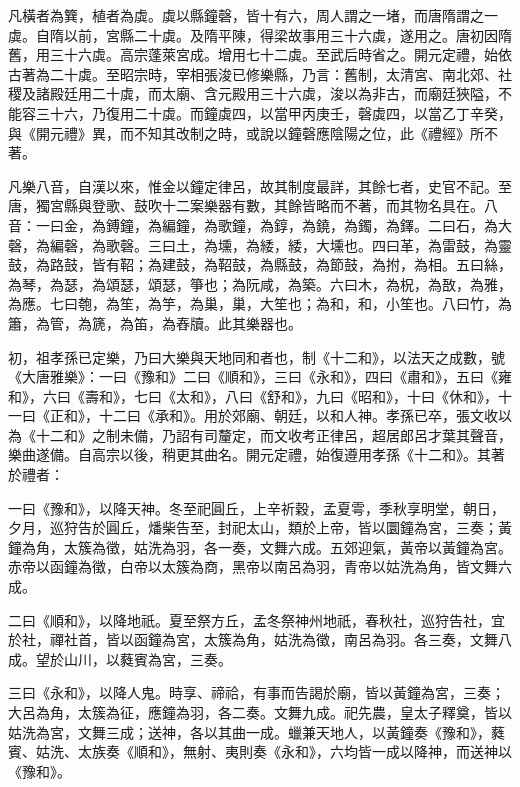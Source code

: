 \begin{pinyinscope}
 凡橫者為簨，植者為虡。虡以縣鐘磬，皆十有六，周人謂之一堵，而唐隋謂之一虡。自隋以前，宮縣二十虡。及隋平陳，得梁故事用三十六虡，遂用之。唐初因隋舊，用三十六虡。高宗蓬萊宮成。增用七十二虡。至武后時省之。開元定禮，始依古著為二十虡。至昭宗時，宰相張浚已修樂縣，乃言：舊制，太清宮、南北郊、社稷及諸殿廷用二十虡，而太廟、含元殿用三十六虡，浚以為非古，而廟廷狹隘，不能容三十六，乃復用二十虡。而鐘虡四，以當甲丙庚壬，磬虡四，以當乙丁辛癸，與《開元禮》異，而不知其改制之時，或說以鐘磬應陰陽之位，此《禮經》所不著。



 凡樂八音，自漢以來，惟金以鐘定律呂，故其制度最詳，其餘七者，史官不記。至唐，獨宮縣與登歌、鼓吹十二案樂器有數，其餘皆略而不著，而其物名具在。八音：一曰金，為鎛鐘，為編鐘，為歌鐘，為錞，為鐃，為鐲，為鐸。二曰石，為大磬，為編磬，為歌磬。三曰土，為壎，為緌，緌，大壎也。四曰革，為雷鼓，為靈鼓，為路鼓，皆有鞀；為建鼓，為鞀鼓，為縣鼓，為節鼓，為拊，為相。五曰絲，為琴，為瑟，為頌瑟，頌瑟，箏也；為阮咸，為築。六曰木，為柷，為敔，為雅，為應。七曰匏，為笙，為竽，為巢，巢，大笙也；為和，和，小笙也。八曰竹，為簫，為管，為篪，為笛，為舂牘。此其樂器也。



 初，祖孝孫已定樂，乃曰大樂與天地同和者也，制《十二和》，以法天之成數，號《大唐雅樂》：一曰《豫和》二曰《順和》，三曰《永和》，四曰《肅和》，五曰《雍和》，六曰《壽和》，七曰《太和》，八曰《舒和》，九曰《昭和》，十曰《休和》，十一曰《正和》，十二曰《承和》。用於郊廟、朝廷，以和人神。孝孫已卒，張文收以為《十二和》之制未備，乃詔有司釐定，而文收考正律呂，超居郎呂才葉其聲音，樂曲遂備。自高宗以後，稍更其曲名。開元定禮，始復遵用孝孫《十二和》。其著於禮者：



 一曰《豫和》，以降天神。冬至祀圓丘，上辛祈穀，孟夏雩，季秋享明堂，朝日，夕月，巡狩告於圓丘，燔柴告至，封祀太山，類於上帝，皆以圜鐘為宮，三奏；黃鐘為角，太簇為徵，姑洗為羽，各一奏，文舞六成。五郊迎氣，黃帝以黃鐘為宮。赤帝以函鐘為徵，白帝以太簇為商，黑帝以南呂為羽，青帝以姑洗為角，皆文舞六成。



 二曰《順和》，以降地祇。夏至祭方丘，孟冬祭神州地祇，春秋社，巡狩告社，宜於社，禪社首，皆以函鐘為宮，太簇為角，姑洗為徵，南呂為羽。各三奏，文舞八成。望於山川，以蕤賓為宮，三奏。



 三曰《永和》，以降人鬼。時享、禘祫，有事而告謁於廟，皆以黃鐘為宮，三奏；大呂為角，太簇為征，應鐘為羽，各二奏。文舞九成。祀先農，皇太子釋奠，皆以姑洗為宮，文舞三成；送神，各以其曲一成。蠟兼天地人，以黃鐘奏《豫和》，蕤賓、姑洗、太族奏《順和》，無射、夷則奏《永和》，六均皆一成以降神，而送神以《豫和》。




\end{pinyinscope}
